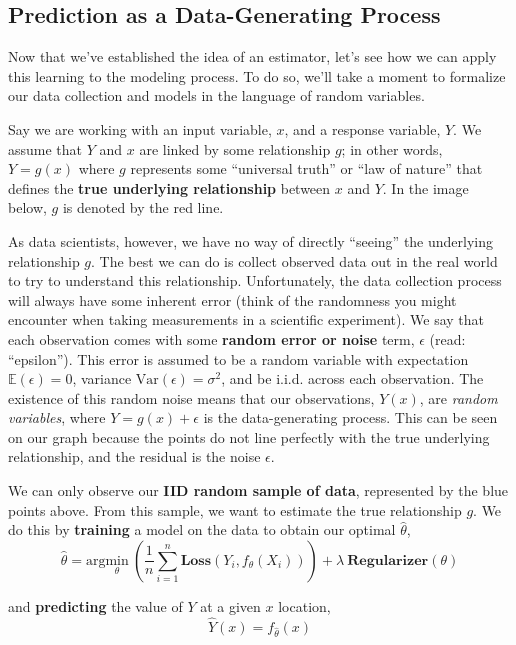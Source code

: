 \documentclass[
  letterpaper,
  DIV=11,
  numbers=noendperiod]{scrreprt}
\begin{document}
\subsection{Prediction as a Data-Generating
Process}\label{prediction-as-a-data-generating-process}

Now that we've established the idea of an estimator, let's see how we
can apply this learning to the modeling process. To do so, we'll take a
moment to formalize our data collection and models in the language of
random variables.

Say we are working with an input variable, \(x\), and a response
variable, \(Y\). We assume that \(Y\) and \(x\) are linked by some
relationship \(g\); in other words, \(Y = g(x)\) where \(g\) represents
some ``universal truth'' or ``law of nature'' that defines the
\textbf{true underlying relationship} between \(x\) and \(Y\). In the
image below, \(g\) is denoted by the red line.

As data scientists, however, we have no way of directly ``seeing'' the
underlying relationship \(g\). The best we can do is collect observed
data out in the real world to try to understand this relationship.
Unfortunately, the data collection process will always have some
inherent error (think of the randomness you might encounter when taking
measurements in a scientific experiment). We say that each observation
comes with some \textbf{random error or noise} term, \(\epsilon\) (read:
``epsilon''). This error is assumed to be a random variable with
expectation \(\mathbb{E}(\epsilon)=0\), variance
\(\text{Var}(\epsilon) = \sigma^2\), and be i.i.d. across each
observation. The existence of this random noise means that our
observations, \(Y(x)\), are \emph{random variables}, where
\(Y = g(x) + \epsilon\) is the data-generating process. This can be seen
on our graph because the points do not line perfectly with the true
underlying relationship, and the residual is the noise \(\epsilon\).

We can only observe our \textbf{IID random sample of data}, represented
by the blue points above. From this sample, we want to estimate the true
relationship \(g\). We do this by \textbf{training} a model on the data
to obtain our optimal \(\hat{\theta}\),
\[ {\hat{\theta}} = \text{arg}\underset{\theta}{\text{min}}\  \left(\frac{1}{n} \sum_{i=1}^n \textbf{Loss}(Y_i, f_{\theta}(X_i))\right) + \lambda\ \textbf{Regularizer}(\theta)\]

and \textbf{predicting} the value of \(Y\) at a given \(x\) location,
\[ \hat{Y}(x) = f_{\hat{\theta}}(x)\]
\end{document}
